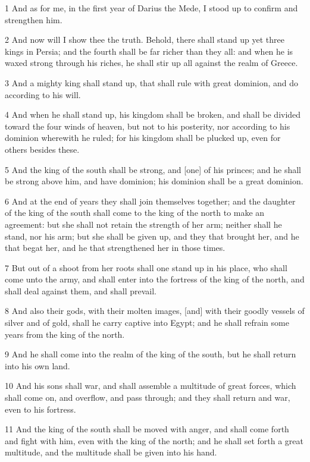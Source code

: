 \par 1 And as for me, in the first year of Darius the Mede, I stood up to confirm and strengthen him.
\par 2 And now will I show thee the truth. Behold, there shall stand up yet three kings in Persia; and the fourth shall be far richer than they all: and when he is waxed strong through his riches, he shall stir up all against the realm of Greece.
\par 3 And a mighty king shall stand up, that shall rule with great dominion, and do according to his will.
\par 4 And when he shall stand up, his kingdom shall be broken, and shall be divided toward the four winds of heaven, but not to his posterity, nor according to his dominion wherewith he ruled; for his kingdom shall be plucked up, even for others besides these.
\par 5 And the king of the south shall be strong, and [one] of his princes; and he shall be strong above him, and have dominion; his dominion shall be a great dominion.
\par 6 And at the end of years they shall join themselves together; and the daughter of the king of the south shall come to the king of the north to make an agreement: but she shall not retain the strength of her arm; neither shall he stand, nor his arm; but she shall be given up, and they that brought her, and he that begat her, and he that strengthened her in those times.
\par 7 But out of a shoot from her roots shall one stand up in his place, who shall come unto the army, and shall enter into the fortress of the king of the north, and shall deal against them, and shall prevail.
\par 8 And also their gods, with their molten images, [and] with their goodly vessels of silver and of gold, shall he carry captive into Egypt; and he shall refrain some years from the king of the north.
\par 9 And he shall come into the realm of the king of the south, but he shall return into his own land.
\par 10 And his sons shall war, and shall assemble a multitude of great forces, which shall come on, and overflow, and pass through; and they shall return and war, even to his fortress.
\par 11 And the king of the south shall be moved with anger, and shall come forth and fight with him, even with the king of the north; and he shall set forth a great multitude, and the multitude shall be given into his hand.
